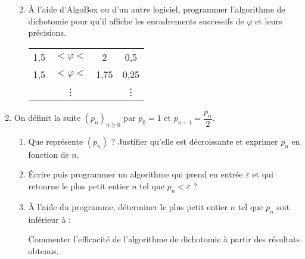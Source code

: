 \begin{TP}
\begin{enumerate}
\begin{enumerate}
\begin{minipage}{0.35\linewidth}
\end{minipage}
\item À l'aide d'AlgoBox ou d'un autre logiciel, programmer l'algorithme de dichotomie pour qu'il affiche les encadrements successifs de $\varphi$ et leurs précisions.
\begin{center}
\begin{tabular}{c@{\,}c@{\,}c|c}
1,5 & $<\varphi<$ &   2  &  0,5 \\
1,5 & $<\varphi<$ &   1,75  &  0,25 \\
 & \vdots  &     & \vdots \\
\end{tabular}
\end{center}
\end{enumerate}
\item On définit  la suite $(p_n)_{n\geqslant0}$ par $p_0=1$ et $p_{n+1}=\dfrac{p_n}{2}$.
\begin{enumerate}
\item Que représente $(p_n)$ ? Justifier qu'elle est décroissante et exprimer $p_n$ en fonction de $n$.
\item Écrire puis programmer un algorithme qui prend en entrée $\varepsilon$ et qui retourne le plus petit entier $n$ tel que $p_n<\varepsilon$ ?
\item À l'aide du programme, déterminer le plus petit entier $n$ tel que  $p_n$ soit inférieur à :
Commenter l'efficacité de l'algorithme de dichotomie à partir des résultats obtenus.  
\end{enumerate}
\end{enumerate}
\end{TP} 

